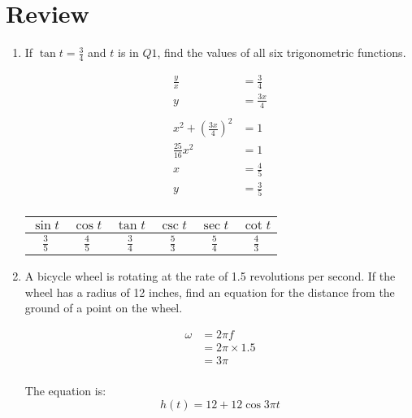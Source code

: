 \documentclass{exam}
\begin{document}
  \section{Review}
  \begin{enumerate}
    \item If $\tan t = \frac{3}{4}$ and $t$ is in $Q1$, find the values of all six trigonometric functions.

      \begin{solution}
        \begin{align*}
          \frac{y}{x} & = \frac{3}{4} \\
          y           & = \frac{3x}{4} \\
          \\
          x^2 + \left( \frac{3x}{4} \right)^2 &= 1 \\
          \frac{25}{16} x^2 & = 1 \\
          x                 & = \frac{4}{5} \\
          y                 & = \frac{3}{5} \\
        \end{align*}

        \begin{tabular}[H]{cccccc}
          \toprule
          $\sin t$      & $\cos t$      & $\tan t$      & $\csc t$      & $\sec t$      & $\cot t$ \\
          \midrule
          $\frac{3}{5}$ & $\frac{4}{5}$ & $\frac{3}{4}$ & $\frac{5}{3}$ & $\frac{5}{4}$ & $\frac{4}{3}$ \\
          \bottomrule
        \end{tabular}

      \end{solution}

    \item A bicycle wheel is rotating at the rate of 1.5 revolutions per second.  If the wheel has a radius of 12
      inches, find an equation for the distance from the ground of a point on the wheel.

      \begin{solution}
        \begin{align*}
          \omega & = 2 \pi f \\
                 & = 2 \pi \times 1.5 \\
                 & = 3 \pi \\
        \end{align*}

        The equation is:
        \[
          h(t) = 12 + 12 \cos 3 \pi t 
        \]
      \end{solution}

  \end{enumerate}
\end{document}
